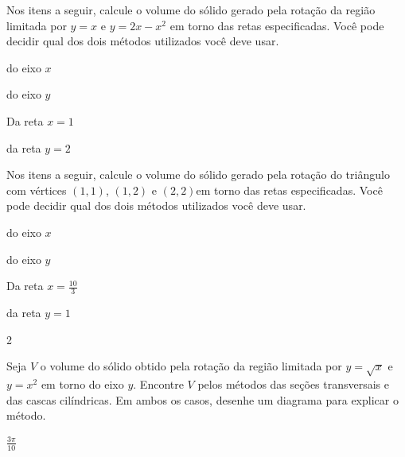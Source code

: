 \begin{exercises}
\begin{exercise}
Nos itens a seguir, calcule o volume do sólido gerado pela rotação da região
limitada por $y=x$ e $y=2x-x^2$ em torno  das retas especificadas.
Você pode decidir qual dos dois métodos utilizados você deve usar.
\begin{alphalist}
  \item do eixo $x$
  \item do eixo $y$
  \item Da reta $x=1$
  \item da reta $y=2$
\end{alphalist}
\end{exercise}

\begin{exercise}
Nos itens a seguir, calcule o volume do sólido gerado pela rotação do
triângulo com vértices $(1,1)$, $(1,2)$ e $(2,2)$em torno  das retas
especificadas.
Você pode decidir qual dos dois métodos utilizados você deve usar.
\begin{alphalist}
  \item do eixo $x$
  \item do eixo $y$
  \item Da reta $x=\frac{10}{3}$
  \item da reta $y=1$
\end{alphalist}
\begin{answer}
\begin{mathlist}[2]
  \item {}
  \item {}
  \item 2\pi
  \item {}
\end{mathlist}
\end{answer}
\end{exercise}

\begin{exercise}
  Seja $V$ o volume do sólido obtido pela rotação da região
  limitada por $y=\sqrt{x}$ e $y=x^2$ em torno do eixo $y$. Encontre $V$
  pelos métodos das seções transversais e das cascas cilíndricas.
  Em ambos os casos, desenhe um diagrama para explicar o método.
\begin{answer}
  $\frac{3\pi}{10}$
\end{answer}
\end{exercise}


\end{exercises}
